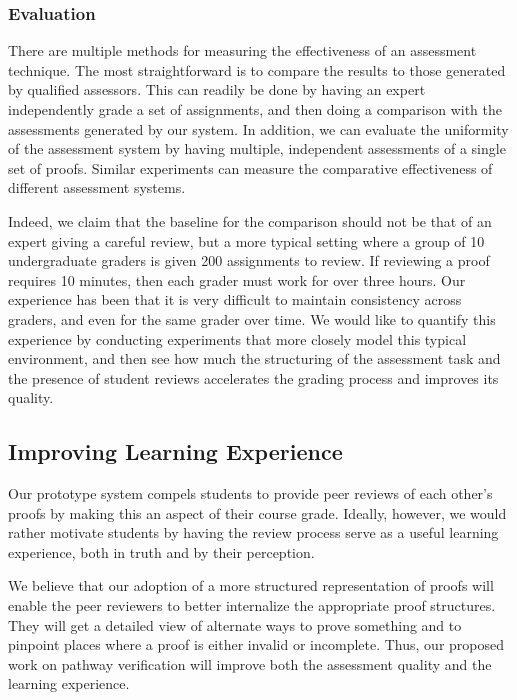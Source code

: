 \documentclass[12pt]{article}
\begin{document}
\subsubsection{Evaluation}

There are multiple methods for measuring the effectiveness of an
assessment technique.  The most straightforward is to compare the
results to those generated by qualified assessors.  This can readily
be done by having an expert independently grade a set of
assignments, and then doing a comparison with the assessments
generated by our system.  In addition, we can evaluate the uniformity
of the assessment system by having multiple, independent assessments
of a single set of proofs.  Similar experiments can measure the
comparative effectiveness of different assessment systems.

Indeed, we claim that the baseline for the comparison
should not be that of an expert giving a careful review, but a more
typical setting where a group of 10 undergraduate graders is given 200
assignments to review.  If reviewing a proof requires 10 minutes, then
each grader must work for over three hours.  Our experience has been
that it is very difficult to maintain consistency across graders, and
even for the same grader over time.  We would like to quantify this
experience by conducting experiments that more closely model this
typical environment, and then see how much the structuring of the
assessment task and the presence of student
reviews accelerates the grading process and improves its quality.

\subsection{Improving Learning Experience}

Our prototype system compels students to provide peer reviews of each
other's proofs by making this an aspect of their course grade.
Ideally, however, we would
rather motivate students by having the review process serve as a useful
learning experience, both in truth and by their perception.

We believe that our adoption of a more structured representation of
proofs will enable the peer reviewers to better internalize the
appropriate proof structures.  They will get a detailed view of
alternate ways to prove something and to pinpoint places where a proof
is either invalid or incomplete.  Thus, our proposed work on pathway
verification will improve both the assessment quality and the learning
experience. 
\end{document}
